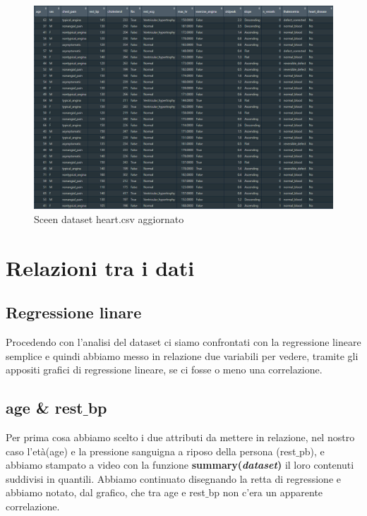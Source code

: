 \documentclass{article}
\begin{document}
\begin{figure}[h]
	\centering
	\includegraphics[width=1\textwidth]{analyzed heart.png}
	\caption{Sceen dataset heart.csv aggiornato}
	\label {fig:ds1}
\end{figure}

\section { Relazioni tra i dati }
\subsection { Regressione linare }
Procedendo con l’analisi del dataset ci siamo confrontati con la regressione lineare semplice e quindi abbiamo messo in relazione due variabili per vedere, tramite gli appositi grafici di regressione lineare, se ci fosse o meno una correlazione.
\subsection { age \& rest$\_$bp }
Per prima cosa abbiamo scelto i due attributi da mettere in relazione, nel nostro caso l'età(age) e la pressione sanguigna a riposo della persona (rest$\_$pb), e abbiamo stampato a video con la funzione \textbf{summary(\textit{dataset})} il loro contenuti suddivisi in quantili. Abbiamo continuato disegnando la retta di regressione e abbiamo notato, dal grafico, che tra age e rest$\_$bp non c’era un apparente correlazione.
\end{document}
